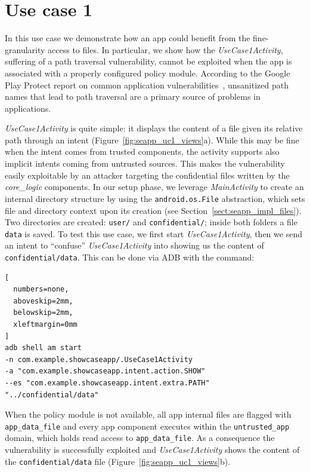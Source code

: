 \section{Use case 1}\label{appendix:seapp_uc1}

In this use case we demonstrate how an app could benefit from the
fine-granularity access to files.  In particular, we show how the {\em
  UseCase1Activity}, suffering of a path traversal vulnerability,
cannot be exploited when the app is associated with a properly
configured policy module.  According to the Google Play Protect report
on common application
vulnerabilities~\cite{seapp_common_play_protect_vulnerabilites},
unsanitized path names that lead to path traversal are a primary
source of problems in applications.

{\em UseCase1Activity} is quite simple: it displays the content of a
file given its relative path through an intent
(Figure~\ref{fig:seapp_uc1_views}a). While this may be fine when the
intent comes from trusted components, the activity supports also
implicit intents coming from untrusted sources. This makes the
vulnerability easily exploitable by an attacker targeting the
confidential files written by the {\em core\_logic} components.
%
In our setup phase, we leverage {\em MainActivity} to create an
internal directory structure by using the {\tt android.os.File}
abstraction, which sets file and directory context upon its creation
(see Section~\ref{sect:seapp_impl_files}). Two directories are
created: {\tt user/} and {\tt confidential/}; inside both folders a
file {\tt data} is saved.
%
To test this use case, we first start {\em UseCase1Activity}, then we
send an intent to ``confuse'' {\em UseCase1Activity} into showing us
the content of {\tt confidential/data}. This can be done via ADB with
the command:
\begin{lstlisting}[
  numbers=none,
  aboveskip=2mm,
  belowskip=2mm,
  xleftmargin=0mm
]
adb shell am start
-n com.example.showcaseapp/.UseCase1Activity
-a "com.example.showcaseapp.intent.action.SHOW"
--es "com.example.showcaseapp.intent.extra.PATH" "../confidential/data"
\end{lstlisting}

When the policy module is not available, all app internal files are
flagged with {\tt app\_data\_file} and every app component executes
within the {\tt untrusted\_app} domain, which holds read access to
{\tt app\_data\_file}. As a consequence the vulnerability is
successfully exploited and {\em UseCase1Activity} shows the content of
the {\tt confidential/data} file (Figure~\ref{fig:seapp_uc1_views}b).

